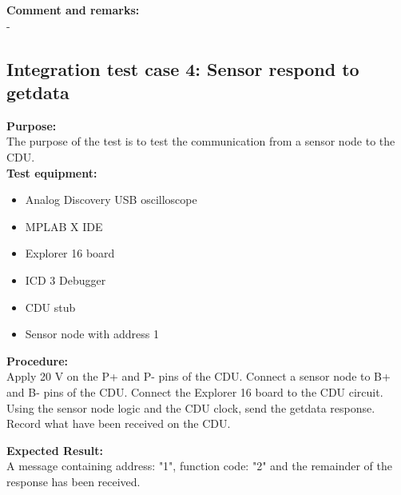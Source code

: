 \textbf{Comment and remarks:}\\
-\\

\subsection{Integration test case 4: Sensor respond to getdata}
\textbf{Purpose:}\\
The purpose of the test is to test the communication from a sensor node to the CDU.\\

\textbf{Test equipment:}
\begin{itemize}
\item Analog Discovery USB oscilloscope
\item MPLAB X IDE
\item Explorer 16 board
\item ICD 3 Debugger
\item CDU stub
\item Sensor node with address 1
\end{itemize}

\textbf{Procedure:}\\
Apply 20 V on the P+ and P- pins of the CDU. Connect a sensor node to B+ and B- pins of the CDU. Connect the Explorer 16 board to the CDU circuit. Using the sensor node logic and the CDU clock, send the getdata response. Record what have been received on the CDU.

\textbf{Expected Result:}\\
A message containing address: "1", function code: "2" and the remainder of the response has been received.\\

